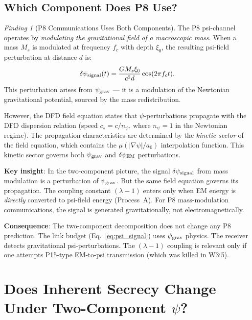 \documentclass[11pt]{article}
\theoremstyle{definition}
\theoremstyle{remark}
\newtheorem{finding}[theorem]{Finding}
\newcommand{\psigrav}{\psi_{\rm grav}}
\newcommand{\dpsiEM}{\delta\psi_{\rm EM}}
\newcommand{\lam}{\lambda}
\begin{document}
\subsection{Which Component Does P8 Use?}

\begin{finding}[P8 Communications Uses Both Components]
\label{find:p8_both_components}
The P8 psi-channel operates by \emph{modulating the gravitational field
of a macroscopic mass}. When a mass $M_s$ is modulated at frequency $f_c$
with depth $\xi_0$, the resulting psi-field perturbation at distance $d$ is:
\begin{equation}
\delta\psi_{\rm signal}(t) = \frac{G M_s \xi_0}{c^2 d}\cos(2\pi f_c t).
\label{eq:psi_signal}
\end{equation}
This perturbation arises from $\psigrav$ --- it is a modulation of the
Newtonian gravitational potential, sourced by the mass redistribution.

However, the DFD field equation states that $\psi$-perturbations propagate
with the DFD dispersion relation (speed $c_s = c/n_\psi$, where
$n_\psi = 1$ in the Newtonian regime). The propagation characteristics
are determined by the \emph{kinetic sector} of the field equation, which
contains the $\mu(|\nabla\psi|/a_0)$ interpolation function. This kinetic
sector governs both $\psigrav$ and $\dpsiEM$ perturbations.

\textbf{Key insight}: In the two-component picture, the signal
$\delta\psi_{\rm signal}$ from mass modulation is a perturbation of
$\psigrav$. But the same field equation governs its propagation.
The coupling constant $(\lam-1)$ enters only when EM energy is
\emph{directly} converted to psi-field energy (Process~A). For P8
mass-modulation communications, the signal is generated gravitationally,
not electromagnetically.

\textbf{Consequence}: The two-component decomposition does not change any
P8 prediction. The link budget (Eq.~\ref{eq:psi_signal}) uses $\psigrav$
physics. The receiver detects gravitational psi-perturbations. The
$(\lam-1)$ coupling is relevant only if one attempts P15-type EM-to-psi
transmission (which was killed in W3i5).
\end{finding}

\section{Does Inherent Secrecy Change Under Two-Component $\psi$?}
\label{sec:secrecy_two_component}
\end{document}
